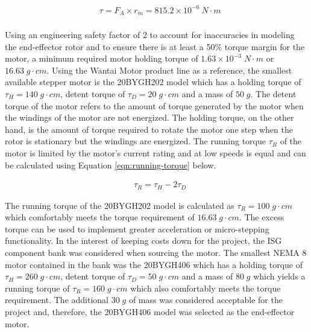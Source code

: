 \begin{align}
	& \tau = F_A \times r_m = 815.2 \times 10^{-6} \: N \cdot m
	\label{eqn:end-effector-motor-torque} \\
\end{align}

Using an engineering safety factor of 2 to account for inaccuracies in modeling the end-effector rotor and to ensure there is at least a 50\% torque margin for the motor, a minimum required motor holding torque of $1.63 \times 10^{-3} \; N \cdot m$ or $16.63 \; g \cdot cm$. Using the Wantai Motor product line as a reference, the smallest available stepper motor is the 20BYGH202 model which has a holding torque of $\tau_H=140 \; g \cdot cm$, detent torque of $\tau_D=20 \; g \cdot cm$ and a mass of $50 \; g$. The detent torque of the motor refers to the amount of torque generated by the motor when the windings of the motor are not energized. The holding torque, on the other hand, is the amount of torque required to rotate the motor one step when the rotor is stationary but the windings are energized. The running torque $\tau_R$ of the motor is limited by the motor's current rating and at low speeds is equal and can be calculated using Equation \ref{eqn:running-torque} below.

\begin{align}
	& \tau_R = \tau_H - 2\tau_D
	\label{eqn:running-torque}
\end{align}

The running torque of the 20BYGH202 model is calculated as $\tau_R=100 \; g \cdot cm$ which comfortably meets the torque requirement of $16.63 \; g \cdot cm$. The excess torque can be used to implement greater acceleration or micro-stepping functionality. In the interest of keeping costs down for the project, the ISG component bank was considered when sourcing the motor. The smallest NEMA 8 motor contained in the bank was the 20BYGH406 which has a holding torque of $\tau_H=260 \; g \cdot cm$, detent torque of $\tau_D=50 \; g \cdot cm$ and a mass of $80 \; g$ which yields a running torque of $\tau_R=160 \; g \cdot cm$ which also comfortably meets the torque requirement. The additional $30\;g$ of mass was considered acceptable for the project and, therefore, the 20BYGH406 model was selected as the end-effector motor.

